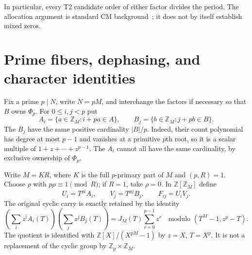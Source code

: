 \documentclass[11pt]{article}
\newcommand{\Z}{\mathbb Z}
\newcommand{\PhiC}{\Phi}
\begin{document}
In particular, every T2 candidate order of either factor divides the period. The allocation argument is standard CM background~\cite[Lemma 2.1]{CM}; it does not by itself establish mixed zeros.

\section{Prime fibers, dephasing, and character identities}
Fix a prime $p\mid N$, write $N=pM$, and interchange the factors if necessary so that $B$ owns $\PhiC_p$. For $0\le i,j<p$ put
\[
 A_i=\{a\in\Z_M:i+pa\in A\},\qquad
 B_j=\{b\in\Z_M:j+pb\in B\}.
\]
The $B_j$ have the same positive cardinality $|B|/p$. Indeed, their count polynomial has degree at most $p-1$ and vanishes at a primitive $p$th root, so it is a scalar multiple of $1+z+\cdots+z^{p-1}$. The $A_i$ cannot all have the same cardinality, by exclusive ownership of $\PhiC_p$.

Write $M=KR$, where $K$ is the full $p$-primary part of $M$ and $(p,R)=1$. Choose $\rho$ with $p\rho\equiv1\pmod R$; if $R=1$, take $\rho=0$. In $\Z[\Z_M]$ define
\[
 U_i=T^{\rho i}A_i,\qquad V_j=T^{\rho j}B_j,\qquad F_{ij}=U_iV_j.
\]
The original cyclic carry is exactly retained by the identity
\begin{equation}\label{eq:carry}
 \left(\sum_i z^iA_i(T)\right)\left(\sum_j z^jB_j(T)\right)
 =J_M(T)\sum_{r=0}^{p-1}z^r
 \quad\text{modulo }(T^M-1,z^p-T).
\end{equation}
The quotient is identified with $\Z[X]/(X^{pM}-1)$ by $z=X$, $T=X^p$. It is not a replacement of the cyclic group by $\Z_p\times\Z_M$.
\end{document}
